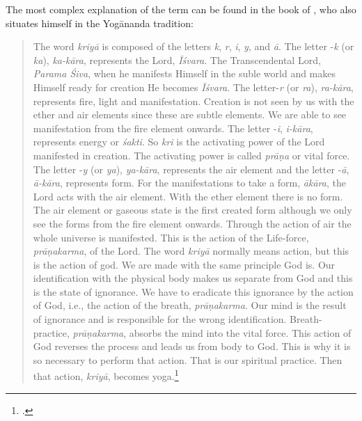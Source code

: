 The most complex explanation of the term can be found in the book  of \citeauthor{kriyayoganityananda2013}, who also situates himself in the Yogānanda tradition: \begin{quote}
  The word \textit{kriyā} is composed of the letters \textit{k}, \textit{r}, \textit{i}, \textit{y}, and \textit{ā}. The letter -\textit{k} (or \textit{ka}), \textit{ka-kāra}, represents the Lord, \textit{Īśvara}. The Transcendental Lord, \textit{Parama Śiva}, when he manifests Himself in the suble world and makes Himself ready for creation He becomes \textit{Īśvara}. The letter-\textit{r} (or \textit{ra}), \textit{ra-kāra}, represents fire, light and manifestation. Creation is not seen by us with the ether and air elements since these are subtle elements. We are able to see manifestation from the fire element onwards. The letter -\textit{i}, \textit{i-kāra}, represents energy or \textit{śakti}. So \textit{kri} is the activating power of the Lord manifested in creation. The activating power is called \textit{prāṇa} or vital force. The letter -\textit{y} (or \textit{ya}), \textit{ya-kāra}, represents the air element and the letter -\textit{ā}, \textit{ā-kāra}, represents form. For the manifestations to take a form, \textit{ākāra}, the Lord acts with the air element. With the ether element there is no form. The air element or gaseous state is the first created form although we only see the forms from the fire element onwards. Through the action of air the whole universe is manifested. This is the action of the Life-force, \textit{prāṇakarma}, of the Lord. The word \textit{kriyā} normally means action, but this is the action of god. We are made with the same principle God is. Our identification with the physical body makes us separate from God and this is the state of ignorance. We have to eradicate this ignorance by the action of God, i.e., the action of the breath, \textit{prāṇakarma}. Our mind is the result of ignorance and is responsible for the wrong identification. Breath-practice, \textit{prāṇakarma}, absorbs the mind into the vital force. This action of God reverses the process and leads us from body to God. This is why it is so necessary to perform that action. That is our spiritual practice. Then that action, \textit{kriyā}, becomes yoga.\footnote{\citeauthor[2013: 2-3]{kriyayoganityananda2013}.}\end{quote}
